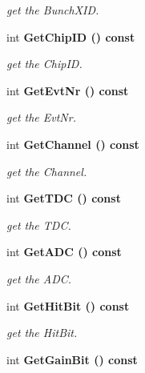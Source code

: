 \begin{CompactItemize}
\begin{CompactList}\small\item\em get the Bunch\-XID. \item\end{CompactList}\item 
int \bf{Get\-Chip\-ID} () const \label{classCALICE_1_1LabviewBlock2_911fe73744c712afcef827a17d39c820}

\begin{CompactList}\small\item\em get the Chip\-ID. \item\end{CompactList}\item 
int \bf{Get\-Evt\-Nr} () const \label{classCALICE_1_1LabviewBlock2_769634f81cdff36b17f205a5b3ac019f}

\begin{CompactList}\small\item\em get the Evt\-Nr. \item\end{CompactList}\item 
int \bf{Get\-Channel} () const \label{classCALICE_1_1LabviewBlock2_f53186d3cdd49b82e60cc284bccfbdd8}

\begin{CompactList}\small\item\em get the Channel. \item\end{CompactList}\item 
int \bf{Get\-TDC} () const \label{classCALICE_1_1LabviewBlock2_b5f73509bfde64f6c7129be4ac08236e}

\begin{CompactList}\small\item\em get the TDC. \item\end{CompactList}\item 
int \bf{Get\-ADC} () const \label{classCALICE_1_1LabviewBlock2_01d616a72f67494b8031490e3ed2f117}

\begin{CompactList}\small\item\em get the ADC. \item\end{CompactList}\item 
int \bf{Get\-Hit\-Bit} () const \label{classCALICE_1_1LabviewBlock2_f380dc641ef61770a734463f8eae41db}

\begin{CompactList}\small\item\em get the Hit\-Bit. \item\end{CompactList}\item 
int \bf{Get\-Gain\-Bit} () const \label{classCALICE_1_1LabviewBlock2_60238db376ceaa048dd904e172ecd5b1}


\end{CompactItemize}
